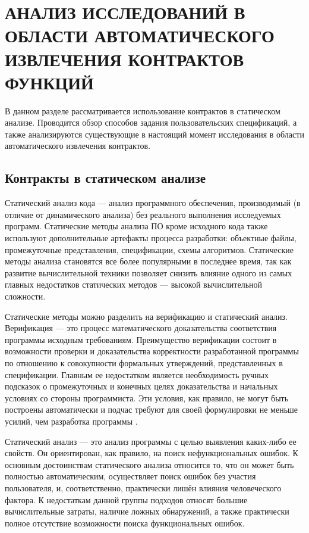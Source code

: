 \chapter{АНАЛИЗ ИССЛЕДОВАНИЙ В ОБЛАСТИ АВТОМАТИЧЕСКОГО ИЗВЛЕЧЕНИЯ КОНТРАКТОВ ФУНКЦИЙ}
\label{chapter:analysis}
В данном разделе рассматривается использование контрактов в статическом анализе. Проводится обзор способов задания пользовательских спецификаций, а также анализируются существующие в настоящий момент исследования в области автоматического извлечения контрактов.

\section{Контракты в статическом анализе}
Статический анализ кода --- анализ программного обеспечения, производимый (в отличие от динамического анализа) без реального выполнения исследуемых программ. Статические методы анализа ПО кроме исходного кода также используют дополнительные артефакты процесса разработки: объектные файлы, промежуточные представления, спецификации, схемы алгоритмов. Статические методы анализа становятся все более популярными в последнее время, так как развитие вычислительной техники позволяет снизить влияние одного из самых главных недостатков статических методов --- высокой вычислительной сложности.

Статические методы можно разделить на верификацию и статический анализ. Верификация --- это процесс математического доказательства соответствия программы исходным требованиям. Преимущество верификации состоит в возможности проверки и доказательства корректности разработанной программы по отношению к совокупности формальных утверждений, представленных в спецификации. Главным ее недостатком является необходимость ручных подсказок о промежуточных и конечных целях доказательства и начальных условиях со стороны программиста. Эти условия, как правило, не могут быть построены автоматически и подчас требуют для своей формулировки не меньше усилий, чем разработка программы .

Статический анализ --- это анализ программы с целью выявления каких-либо ее свойств. Он ориентирован, как правило, на поиск нефункциональных ошибок. К основным достоинствам статического анали­за относится то, что он может быть полностью автоматическим, осуществляет поиск ошибок без участия пользователя, и, соответствен­но, практически лишён влияния человеческого фактора.  К недостаткам данной группы подходов относят большие вычислительные затраты, наличие ложных обнаружений, а также практически полное отсутствие возможности поиска функциональных ошибок.

